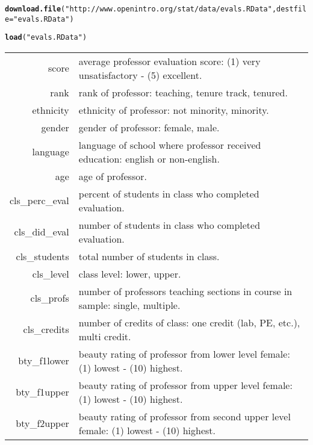 \documentclass{article}\usepackage[]{graphicx}\usepackage[]{color}
\makeatletter
\newcommand{\hlstr}[1]{\textcolor[rgb]{0.192,0.494,0.8}{#1}}%
\newcommand{\hlstd}[1]{\textcolor[rgb]{0.345,0.345,0.345}{#1}}%
\newcommand{\hlkwc}[1]{\textcolor[rgb]{0.333,0.667,0.333}{#1}}%
\newcommand{\hlkwd}[1]{\textcolor[rgb]{0.737,0.353,0.396}{\textbf{#1}}}%
\newenvironment{kframe}{%
 \def\at@end@of@kframe{}%
 \ifinner\ifhmode%
  \def\at@end@of@kframe{\end{minipage}}%
  \begin{minipage}{\columnwidth}%
 \fi\fi%
 \def\FrameCommand##1{\hskip\@totalleftmargin \hskip-\fboxsep
 \colorbox{shadecolor}{##1}\hskip-\fboxsep
     \hskip-\linewidth \hskip-\@totalleftmargin \hskip\columnwidth}%
 \MakeFramed {\advance\hsize-\width
   \@totalleftmargin\z@ \linewidth\hsize
   \@setminipage}}%
 {\par\unskip\endMakeFramed%
 \at@end@of@kframe}
\newenvironment{knitrout}{}{} %
\makeatother
\begin{document}
\begin{knitrout}
\color{fgcolor}\begin{kframe}
\begin{alltt}
\hlkwd{download.file}\hlstd{(}\hlstr{"http://www.openintro.org/stat/data/evals.RData"}\hlstd{,} \hlkwc{destfile} \hlstd{=} \hlstr{"evals.RData"}\hlstd{)}

\hlkwd{load}\hlstd{(}\hlstr{"evals.RData"}\hlstd{)}
\end{alltt}
\end{kframe}
\end{knitrout}


\begin{table}[h] \small
\begin{tabular}{r | l}
\hlstd{score} & average professor evaluation score: (1) very unsatisfactory - (5) excellent. \\
\hlstd{rank} & rank of professor: teaching, tenure track, tenured. \\
\hlstd{ethnicity} & ethnicity of professor: not minority, minority. \\
\hlstd{gender} & gender of professor: female, male. \\
\hlstd{language} & language of school where professor received education: english or non-english. \\
\hlstd{age} & age of professor. \\
\hlstd{cls\_perc\_eval} & percent of students in class who completed evaluation. \\
\hlstd{cls\_did\_eval} & number of students in class who completed evaluation. \\
\hlstd{cls\_students} & total number of students in class. \\
\hlstd{cls\_level} & class level: lower, upper. \\
\hlstd{cls\_profs} & number of professors teaching sections in course in sample: single, multiple. \\
\hlstd{cls\_credits} & number of credits of class: one credit (lab, PE, etc.), multi credit. \\
\hlstd{bty\_f1lower} & beauty rating of professor from lower level female: (1) lowest - (10) highest. \\
\hlstd{bty\_f1upper} & beauty rating of professor from upper level female: (1) lowest - (10) highest. \\
\hlstd{bty\_f2upper} & beauty rating of professor from second upper level female: (1) lowest - (10) highest. \\

\end{tabular}
\end{table}
\end{document}
